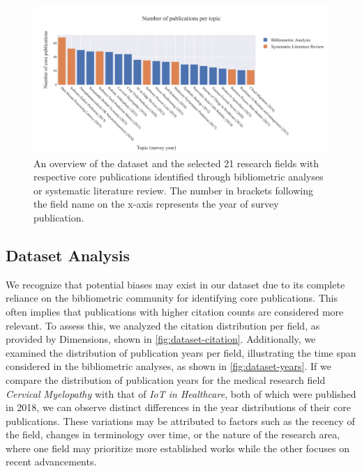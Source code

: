 \begin{figure}
	\centering	
	\includegraphics[scale=0.55]{pics/dataset-overview.pdf}
	\caption[Dataset Overview of the Research Fields]{An overview of the dataset and the selected 21 research fields with respective core publications identified through bibliometric analyses or systematic literature review. The number in brackets following the field name on the x-axis represents the year of survey publication.}
	\label{fig:dataset-overview}
\end{figure}


\subsection*{Dataset Analysis}

We recognize that potential biases may exist in our dataset due to its complete reliance on the bibliometric community for identifying core publications. This often implies that publications with higher citation counts are considered more relevant. To assess this, we analyzed the citation distribution per field, as provided by Dimensions, shown in \autoref{fig:dataset-citation}. Additionally, we examined the distribution of publication years per field, illustrating the time span considered in the bibliometric analyses, as shown in \autoref{fig:dataset-years}.  If we compare the distribution of publication years for the medical research field \textit{Cervical Myelopathy} with that of \textit{IoT in Healthcare}, both of which were published in 2018, we can observe distinct differences in the year distributions of their core publications. These variations may be attributed to factors such as the recency of the field, changes in terminology over time, or the nature of the research area, where one field may prioritize more established works while the other focuses on recent advancements.


